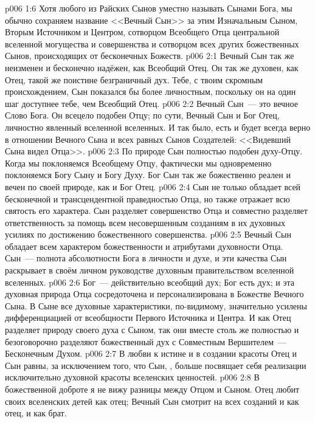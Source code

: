 \vs p006 1:6 Хотя любого из Райских Сынов уместно называть Сынами Бога, мы обычно сохраняем название <<Вечный Сын>> за этим Изначальным Сыном, Вторым Источником и Центром, сотворцом Всеобщего Отца центральной вселенной могущества и совершенства и сотворцом всех других божественных Сынов, происходящих от бесконечных Божеств.
\vs p006 2:1 Вечный Сын так же неизменен и бесконечно надёжен, как Всеобщий Отец. Он так же духовен, как Отец, такой же поистине безграничный дух. Тебе, с твоим скромным происхождением, Сын показался бы более личностным, поскольку он на один шаг доступнее тебе, чем Всеобщий Отец.
\vs p006 2:2 Вечный Сын~--- это вечное Слово Бога. Он всецело подобен Отцу; по сути, Вечный Сын и  Бог Отец, личностно явленный вселенной вселенных. И так было, есть и будет всегда верно в отношении Вечного Сына и всех равных Сынов Создателей: <<Видевший Сына видел Отца>>.
\vs p006 2:3 По природе Сын полностью подобен духу\hyp{}Отцу. Когда мы поклоняемся Всеобщему Отцу, фактически мы одновременно поклоняемся Богу Сыну и Богу Духу. Бог Сын так же божественно реален и вечен по своей природе, как и Бог Отец.
\vs p006 2:4 Сын не только обладает всей бесконечной и трансцендентной праведностью Отца, но также отражает всю святость его характера. Сын разделяет совершенство Отца и совместно разделяет ответственность за помощь всем несовершенным созданиям в их духовных усилиях по достижению божественного совершенства.
\vs p006 2:5 Вечный Сын обладает всем характером божественности и атрибутами духовности Отца. Сын~---  полнота абсолютности Бога в личности и духе, и эти качества Сын раскрывает в своём личном руководстве духовным правительством вселенной вселенных.
\vs p006 2:6 Бог~--- действительно всеобщий дух; Бог есть дух; и эта духовная природа Отца сосредоточена и персонализирована в Божестве Вечного Сына. В Сыне все духовные характеристики, по\hyp{}видимому, значительно усилены дифференциацией от всеобщности Первого Источника и Центра. И как Отец разделяет природу своего духа с Сыном, так они вместе столь же полностью и безоговорочно разделяют божественный дух с Совместным Вершителем~--- Бесконечным Духом.
\vs p006 2:7 В любви к истине и в создании красоты Отец и Сын равны, за исключением того, что Сын, , больше посвящает себя реализации исключительно духовной красоты вселенских ценностей.
\vs p006 2:8 В божественной доброте я не вижу разницы между Отцом и Сыном. Отец любит своих вселенских детей как отец; Вечный Сын смотрит на всех созданий и как отец, и как брат.
